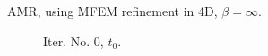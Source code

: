 \documentclass[a4paper,12pt]{amsart}
\numberwithin{equation}{section}
\begin{document}
\begin{figure}[h!]
\caption{AMR, using MFEM refinement in 4D, $\beta = \infty$.}
\label{fig:amr_trans4D_paraview_mfem_longrun_part1}
\end{figure}

\begin{figure}[h!]
\centering
\begin{subfigure}[t]{0.23\textwidth}
    \caption{Iter. No. 0, $t_0$.}
\end{subfigure}
	\hfill
\begin{subfigure}[t]{0.23\textwidth}

\end{subfigure}
\end{figure}
\end{document}
